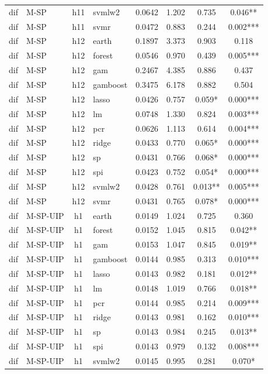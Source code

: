 \begin{ThreePartTable}
\begin{longtable}[t]{llclcccc}
dif & M-SP & h11 & svmlw2 & 0.0642 & 1.202 & 0.735 & 0.046**\\
dif & M-SP & h11 & svmr & 0.0472 & 0.883 & 0.244 & 0.002***\\
\addlinespace
dif & M-SP & h12 & earth & 0.1897 & 3.373 & 0.903 & 0.118\\
dif & M-SP & h12 & forest & 0.0546 & 0.970 & 0.439 & 0.005***\\
dif & M-SP & h12 & gam & 0.2467 & 4.385 & 0.886 & 0.437\\
dif & M-SP & h12 & gamboost & 0.3475 & 6.178 & 0.882 & 0.504\\
dif & M-SP & h12 & lasso & 0.0426 & 0.757 & 0.059* & 0.000***\\
dif & M-SP & h12 & lm & 0.0748 & 1.330 & 0.824 & 0.003***\\
dif & M-SP & h12 & pcr & 0.0626 & 1.113 & 0.614 & 0.004***\\
dif & M-SP & h12 & ridge & 0.0433 & 0.770 & 0.065* & 0.000***\\
dif & M-SP & h12 & sp & 0.0431 & 0.766 & 0.068* & 0.000***\\
dif & M-SP & h12 & spi & 0.0423 & 0.752 & 0.054* & 0.000***\\
dif & M-SP & h12 & svmlw2 & 0.0428 & 0.761 & 0.013** & 0.005***\\
dif & M-SP & h12 & svmr & 0.0431 & 0.765 & 0.078* & 0.000***\\
\addlinespace
dif & M-SP-UIP & h1 & earth & 0.0149 & 1.024 & 0.725 & 0.360\\
dif & M-SP-UIP & h1 & forest & 0.0152 & 1.045 & 0.815 & 0.042**\\
dif & M-SP-UIP & h1 & gam & 0.0153 & 1.047 & 0.845 & 0.019**\\
dif & M-SP-UIP & h1 & gamboost & 0.0144 & 0.985 & 0.313 & 0.010***\\
dif & M-SP-UIP & h1 & lasso & 0.0143 & 0.982 & 0.181 & 0.012**\\
dif & M-SP-UIP & h1 & lm & 0.0148 & 1.019 & 0.766 & 0.018**\\
dif & M-SP-UIP & h1 & pcr & 0.0144 & 0.985 & 0.214 & 0.009***\\
dif & M-SP-UIP & h1 & ridge & 0.0143 & 0.981 & 0.162 & 0.010***\\
dif & M-SP-UIP & h1 & sp & 0.0143 & 0.984 & 0.245 & 0.013**\\
dif & M-SP-UIP & h1 & spi & 0.0143 & 0.979 & 0.132 & 0.008***\\
dif & M-SP-UIP & h1 & svmlw2 & 0.0145 & 0.995 & 0.281 & 0.070*\\

\end{longtable}
\end{ThreePartTable}
